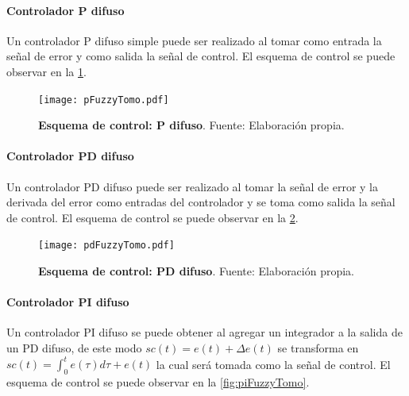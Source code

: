             \paragraph{Controlador P difuso}
                
                Un controlador P difuso simple puede ser realizado al tomar como entrada la señal de error y como salida la señal de control. El esquema de control se puede observar en la \cref{fig:pFuzzyTomo}.

                \begin{figure}[htb]
                    \centering
                    \texttt{[image: pFuzzyTomo.pdf]}
                    \caption[Esquema de control: P difuso]{\textbf{Esquema de control: P difuso}. Fuente: Elaboración propia.} 
                    \label{fig:pFuzzyTomo}
                \end{figure}

            \paragraph{Controlador PD difuso}
                
                Un controlador PD difuso puede ser realizado al tomar la señal de error y la derivada del error como entradas del controlador y se toma como salida la señal de control. El esquema de control se puede observar en la \cref{fig:pdFuzzyTomo}.

                \begin{figure}[htb]
                    \centering
                    \texttt{[image: pdFuzzyTomo.pdf]}
                    \caption[Esquema de control: PD difuso]{\textbf{Esquema de control: PD difuso}. Fuente: Elaboración propia.} 
                    \label{fig:pdFuzzyTomo}
                \end{figure}
            
            \paragraph{Controlador PI difuso}
                
                Un controlador PI difuso se puede obtener al agregar un integrador a la salida de un PD difuso, de este modo $sc(t) = e(t) + \Delta e(t)$ se transforma en $sc(t) = \int_0^t e(\tau)d\tau + e(t)$ la cual será tomada como la señal de control. El esquema de control se puede observar en la \cref{fig:piFuzzyTomo}.

